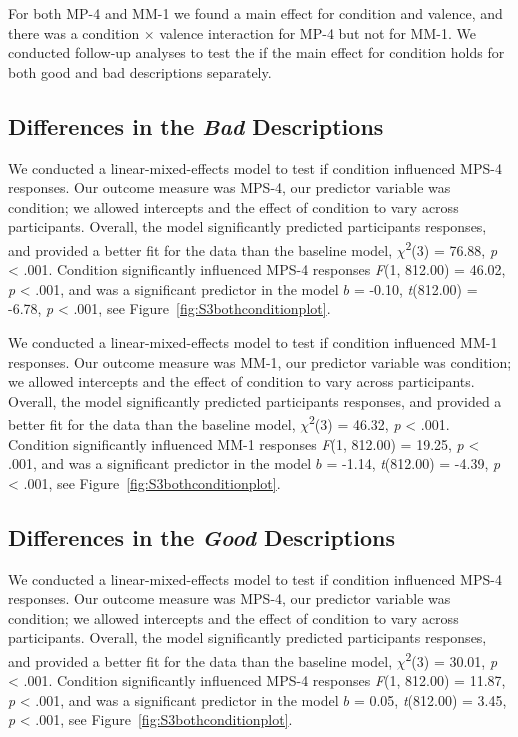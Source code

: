 \documentclass[
  man,floatsintext]{apa6}
\begin{document}
For both MP-4 and MM-1 we found a main effect for condition and valence, and there was a condition \(\times\) valence interaction for MP-4 but not for MM-1. We conducted follow-up analyses to test the if the main effect for condition holds for both good and bad descriptions separately.

\subsection{\texorpdfstring{Differences in the \emph{Bad} Descriptions}{Differences in the Bad Descriptions}}\label{differences-in-the-bad-descriptions}

We conducted a linear-mixed-effects model to test if condition influenced MPS-4 responses. Our outcome measure was MPS-4, our predictor variable was condition; we allowed intercepts and the effect of condition to vary across participants. Overall, the model significantly predicted participants responses, and provided a better fit for the data than the baseline model, \(\chi\)\textsuperscript{2}(3) = 76.88, \emph{p} \textless{} .001. Condition significantly influenced MPS-4 responses \emph{F}(1, 812.00) = 46.02, \emph{p} \textless{} .001, and was a significant predictor in the model \(b\) = -0.10, \emph{t}(812.00) = -6.78, \emph{p} \textless{} .001, see Figure~\ref{fig:S3bothconditionplot}.

We conducted a linear-mixed-effects model to test if condition influenced MM-1 responses. Our outcome measure was MM-1, our predictor variable was condition; we allowed intercepts and the effect of condition to vary across participants. Overall, the model significantly predicted participants responses, and provided a better fit for the data than the baseline model, \(\chi\)\textsuperscript{2}(3) = 46.32, \emph{p} \textless{} .001. Condition significantly influenced MM-1 responses \emph{F}(1, 812.00) = 19.25, \emph{p} \textless{} .001, and was a significant predictor in the model \(b\) = -1.14, \emph{t}(812.00) = -4.39, \emph{p} \textless{} .001, see Figure~\ref{fig:S3bothconditionplot}.

\subsection{\texorpdfstring{Differences in the \emph{Good} Descriptions}{Differences in the Good Descriptions}}\label{differences-in-the-good-descriptions}

We conducted a linear-mixed-effects model to test if condition influenced MPS-4 responses. Our outcome measure was MPS-4, our predictor variable was condition; we allowed intercepts and the effect of condition to vary across participants. Overall, the model significantly predicted participants responses, and provided a better fit for the data than the baseline model, \(\chi\)\textsuperscript{2}(3) = 30.01, \emph{p} \textless{} .001. Condition significantly influenced MPS-4 responses \emph{F}(1, 812.00) = 11.87, \emph{p} \textless{} .001, and was a significant predictor in the model \(b\) = 0.05, \emph{t}(812.00) = 3.45, \emph{p} \textless{} .001, see Figure~\ref{fig:S3bothconditionplot}.
\end{document}
